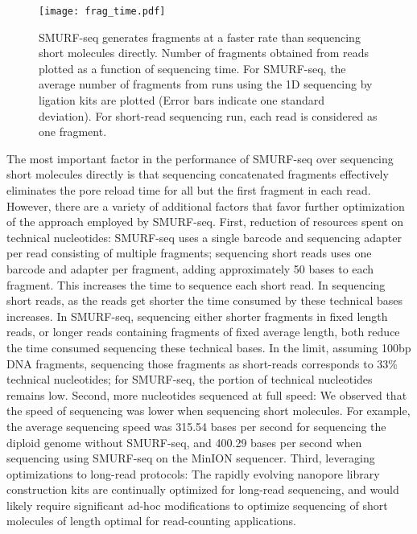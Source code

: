 \begin{figure}[t!]
\centering
\texttt{[image: frag\_time.pdf]}
\caption{SMURF-seq generates fragments at a faster rate than sequencing
short molecules directly. Number of fragments obtained from reads
plotted as a function of  sequencing time. For SMURF-seq, the average
number of fragments from runs using the 1D sequencing by ligation kits
are plotted (Error bars indicate one standard deviation). For short-read
sequencing run, each read is considered as one fragment.}
\label{frag_time}
\end{figure}

The most important factor in the performance of SMURF-seq over
sequencing short molecules directly is that sequencing concatenated
fragments effectively eliminates the pore reload time for all but the
first fragment in each read. However, there are a variety of additional
factors that favor further optimization of the approach employed by
SMURF-seq.
First, reduction of resources spent on technical nucleotides: SMURF-seq
uses a single barcode and sequencing adapter per read consisting of
multiple fragments; sequencing short reads uses one barcode and adapter
per fragment, adding approximately 50 bases to each fragment. This
increases the time to sequence each short read. In sequencing short
reads, as the reads get shorter the time consumed by these technical
bases increases. In SMURF-seq, sequencing either shorter fragments in
fixed length reads, or longer reads containing fragments of fixed
average length, both reduce the time consumed sequencing these technical
bases.
%
In the limit, assuming 100bp DNA fragments, sequencing those fragments
as short-reads corresponds to 33\% technical nucleotides; for SMURF-seq,
the portion of technical nucleotides remains low.
Second, more nucleotides sequenced at full speed: We observed that the
speed of sequencing was lower when sequencing short molecules. For
example, the average sequencing speed was 315.54 bases per second for
sequencing the diploid genome without SMURF-seq, and 400.29 bases per
second when sequencing using SMURF-seq on the MinION sequencer.
Third, leveraging optimizations to long-read protocols: The rapidly
evolving nanopore library construction kits are continually optimized
for long-read sequencing, and would likely require significant ad-hoc
modifications to optimize sequencing of short molecules of length
optimal for read-counting applications.


